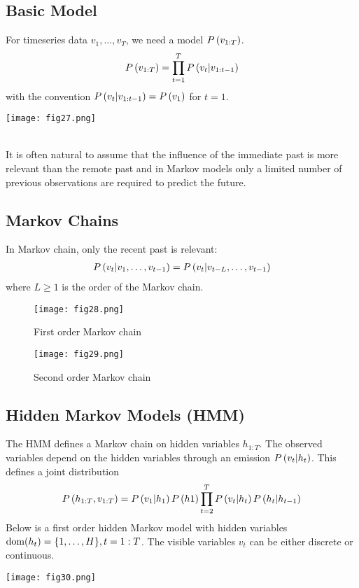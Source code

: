 \subsection{Basic Model}

\begin{minipage}{0.6\textwidth}
	For timeseries data $v_1,\dotsc,v_T$, we need a model $\P{v_{1:T}}$.
	\begin{align*}
	\P{v_{1:T}}=\prod_{t=1}^T\P{v_t|v_{1:t-1}}
	\end{align*}
	with the convention $\P{v_t|v_{1:t-1}}=\P{v_1}$ for $t=1$.
\end{minipage}
\begin{minipage}{0.4\textwidth}
	\centering
	\texttt{[image: fig27.png]}
\end{minipage}
\\

It is often natural to assume that the influence of the immediate past is more relevant than the remote past and in Markov models only a limited number of previous observations are required to predict the future.

\subsection{Markov Chains}

In Markov chain, only the recent past is relevant:
\begin{align*}
\P{v_t|v_1,\dotsc,v_{t-1}}=\P{v_t|v_{t-L},\dotsc,v_{t-1}}
\end{align*}
where $L\geq 1$ is the order of the Markov chain.
\begin{figure*}[h]
	\centering
	\begin{subfigure}[b]{0.45\textwidth}
		\centering
		\texttt{[image: fig28.png]}
		\caption*{First order Markov chain}
	\end{subfigure}
	\begin{subfigure}[b]{0.45\textwidth}
		\centering
		\texttt{[image: fig29.png]}
		\caption*{Second order Markov chain}
	\end{subfigure}
\end{figure*}

\subsection{Hidden Markov Models (HMM)}

The HMM defines a Markov chain on hidden variables $h_{1:T}$. The observed variables depend on the hidden variables through an emission $\P{v_t|h_t}$. This defines a joint distribution
\begin{align*}
\P{h_{1:T},v_{1:T}}=\P{v_1|h_1}\P{h1}\prod_{t=2}^T\P{v_t|h_t}\P{h_t|h_{t-1}}
\end{align*}
Below is a first order hidden Markov model with hidden variables $\dom(h_t)=\{1,\dotsc,H\},t=1:T$. The visible variables $v_t$ can be either discrete or continuous.
\begin{figure*}[h]
	\centering
	\texttt{[image: fig30.png]}
\end{figure*}



